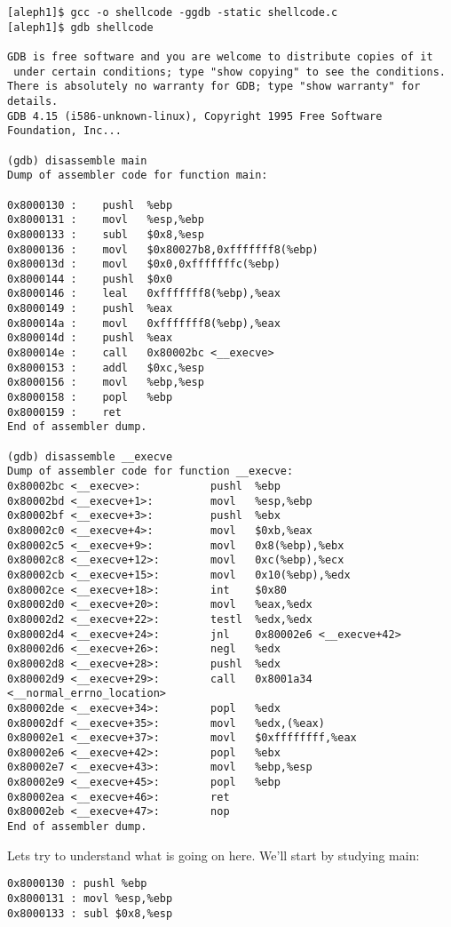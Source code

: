 \documentclass[10pt]{article}
\begin{document}
\begin{lstlisting}
[aleph1]$ gcc -o shellcode -ggdb -static shellcode.c
[aleph1]$ gdb shellcode

GDB is free software and you are welcome to distribute copies of it
 under certain conditions; type "show copying" to see the conditions.
There is absolutely no warranty for GDB; type "show warranty" for details.
GDB 4.15 (i586-unknown-linux), Copyright 1995 Free Software Foundation, Inc...

(gdb) disassemble main
Dump of assembler code for function main:

0x8000130 :    pushl  %ebp
0x8000131 :    movl   %esp,%ebp
0x8000133 :    subl   $0x8,%esp
0x8000136 :    movl   $0x80027b8,0xfffffff8(%ebp)
0x800013d :    movl   $0x0,0xfffffffc(%ebp)
0x8000144 :    pushl  $0x0
0x8000146 :    leal   0xfffffff8(%ebp),%eax
0x8000149 :    pushl  %eax
0x800014a :    movl   0xfffffff8(%ebp),%eax
0x800014d :    pushl  %eax
0x800014e :    call   0x80002bc <__execve>
0x8000153 :    addl   $0xc,%esp
0x8000156 :    movl   %ebp,%esp
0x8000158 :    popl   %ebp
0x8000159 :    ret
End of assembler dump.

(gdb) disassemble __execve
Dump of assembler code for function __execve:
0x80002bc <__execve>:           pushl  %ebp
0x80002bd <__execve+1>:         movl   %esp,%ebp
0x80002bf <__execve+3>:         pushl  %ebx
0x80002c0 <__execve+4>:         movl   $0xb,%eax
0x80002c5 <__execve+9>:         movl   0x8(%ebp),%ebx
0x80002c8 <__execve+12>:        movl   0xc(%ebp),%ecx
0x80002cb <__execve+15>:        movl   0x10(%ebp),%edx
0x80002ce <__execve+18>:        int    $0x80
0x80002d0 <__execve+20>:        movl   %eax,%edx
0x80002d2 <__execve+22>:        testl  %edx,%edx
0x80002d4 <__execve+24>:        jnl    0x80002e6 <__execve+42>
0x80002d6 <__execve+26>:        negl   %edx
0x80002d8 <__execve+28>:        pushl  %edx
0x80002d9 <__execve+29>:        call   0x8001a34 <__normal_errno_location>
0x80002de <__execve+34>:        popl   %edx
0x80002df <__execve+35>:        movl   %edx,(%eax)
0x80002e1 <__execve+37>:        movl   $0xffffffff,%eax
0x80002e6 <__execve+42>:        popl   %ebx
0x80002e7 <__execve+43>:        movl   %ebp,%esp
0x80002e9 <__execve+45>:        popl   %ebp
0x80002ea <__execve+46>:        ret
0x80002eb <__execve+47>:        nop
End of assembler dump.
\end{lstlisting}

Lets try to understand what is going on here.  We'll start by studying main: 

\begin{lstlisting}
0x8000130 : pushl %ebp
0x8000131 : movl %esp,%ebp
0x8000133 : subl $0x8,%esp
\end{lstlisting}
\end{document}

